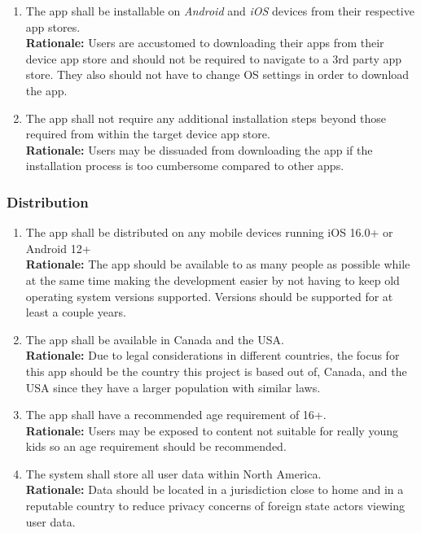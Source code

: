 \documentclass{article}
\begin{document}
\begin{enumerate}[align=left, label=\textbf{DI-I\arabic*.}]
    \item The app shall be installable on \emph{Android} and \emph{iOS} devices from their respective app stores.\\
          {\bf Rationale:} Users are accustomed to downloading their apps from their device app store and should not be required to navigate to a 3rd party app store. They also should not have to change OS settings in order to download the app.
    \item The app shall not require any additional installation steps beyond those required from within the target device app store.\\
          {\bf Rationale:} Users may be dissuaded from downloading the app if the installation process is too cumbersome compared to other apps.
\end{enumerate}

\subsubsection{Distribution}
\label{ssub:distribution}


\begin{enumerate}[align=left, label=\textbf{DI-D\arabic*.}]
    \item The app shall be distributed on any mobile devices running iOS 16.0+ or Android 12+\\
          {\bf Rationale:} The app should be available to as many people as possible while at the same time making the development easier by not having to keep old operating system versions supported. Versions should be supported for at least a couple years.
    \item The app shall be available in Canada and the USA.\\
          {\bf Rationale:} Due to legal considerations in different countries, the focus for this app should be the country this project is based out of, Canada, and the USA since they have a larger population with similar laws.
    \item The app shall have a recommended age requirement of 16+.\\
          {\bf Rationale:} Users may be exposed to content not suitable for really young kids so an age requirement should be recommended.
    \item The system shall store all user data within North America.\\
          {\bf Rationale:} Data should be located in a jurisdiction close to home and in a reputable country to reduce privacy concerns of foreign state actors viewing user data.
\end{enumerate}
\end{document}
